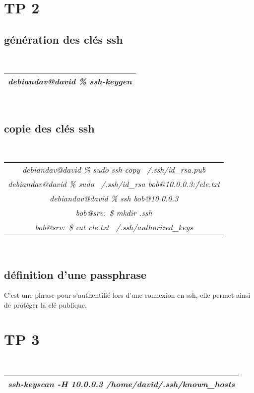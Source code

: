 \documentclass{report}
\begin{document}
\section{TP 2}
\subsection{génération des clés ssh}
\\
\begin{tabular}{|c|}
\hline
\textit{debiandav@david \% ssh-keygen} \\
\hline
\end{tabular}
\\
\subsection{copie des clés ssh}
\\
\begin{tabular}{|c|}
\hline 
\textit{debiandav@david \% sudo ssh-copy ~/.ssh/id\_rsa.pub} \\
\textit{debiandav@david \% sudo ~/.ssh/id\_rsa bob@10.0.0.3:\./cle.txt} \\ 
\textit{debiandav@david \% ssh bob@10.0.0.3} \\
\hline
\textit{bob@srv:~\$ mkdir .ssh} \\
\textit{bob@srv:~\$ cat cle.txt \> ~/.ssh/authorized\_keys} \\
\hline
\end{tabular}
\\

\subsection{définition d'une passphrase}
C'est une phrase pour s'authentifié lors d'une connexion en ssh, 
elle permet ainsi de protéger la clé publique.

\section{TP 3}
\\
\begin{tabular}{|c|}
\hline
\textit{ssh-keyscan -H 10.0.0.3 \> /home/david/.ssh/known\_hosts} \\
\hline
\end{tabular}
\\
\end{document}
